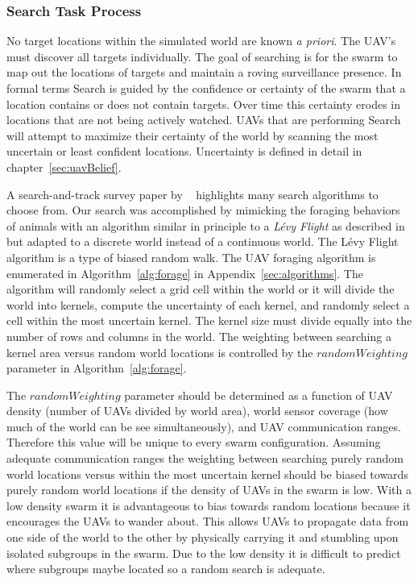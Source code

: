 \subsubsection{Search Task Process}
No target locations within the simulated world are known \textit{a priori}.  The UAV's must discover all targets individually.  The goal of searching is for the swarm to map out the locations of targets and maintain a roving surveillance presence. In formal terms Search is guided by the confidence or certainty of the swarm that a location contains or does not contain targets.  Over time this certainty erodes in locations that are not being actively watched.  UAVs that are performing Search will attempt to maximize their certainty of the world by scanning the most uncertain or least confident locations.  Uncertainty is defined in detail in chapter~\ref{sec:uavBelief}.

A search-and-track survey paper by ~\textcite{senanayake} highlights many search algorithms to choose from. Our search was accomplished by mimicking the foraging behaviors of animals with an algorithm similar in principle to a \textit{L\'evy Flight} as described in \textcite{humphries} but adapted to a discrete world instead of a continuous world.  The L\'evy Flight algorithm is a type of biased random walk.  The UAV foraging algorithm is enumerated in Algorithm~\ref{alg:forage} in Appendix~\ref{sec:algorithms}.  The algorithm will randomly select a grid cell within the world or it will divide the world into kernels, compute the uncertainty of each kernel, and randomly select a cell within the most uncertain kernel.  The kernel size must divide equally into the number of rows and columns in the world.  The weighting between searching a kernel area versus random world locations is controlled by the $randomWeighting$ parameter in Algorithm~\ref{alg:forage}.

The $randomWeighting$ parameter should be determined as a function of UAV density (number of UAVs divided by world area), world sensor coverage (how much of the world can be see simultaneously), and  UAV communication ranges.  Therefore this value will be unique to every swarm configuration.  Assuming adequate communication ranges the weighting between searching purely random world locations versus within the most uncertain kernel should be biased towards purely random world locations if the density of UAVs in the swarm is low.  With a low density swarm it is advantageous to bias towards random locations because it encourages the UAVs to wander about.  This allows UAVs to propagate data from one side of the world to the other by physically carrying it and stumbling upon isolated subgroups in the swarm.  Due to the low density it is difficult to predict where subgroups maybe located so a random search is adequate.  

